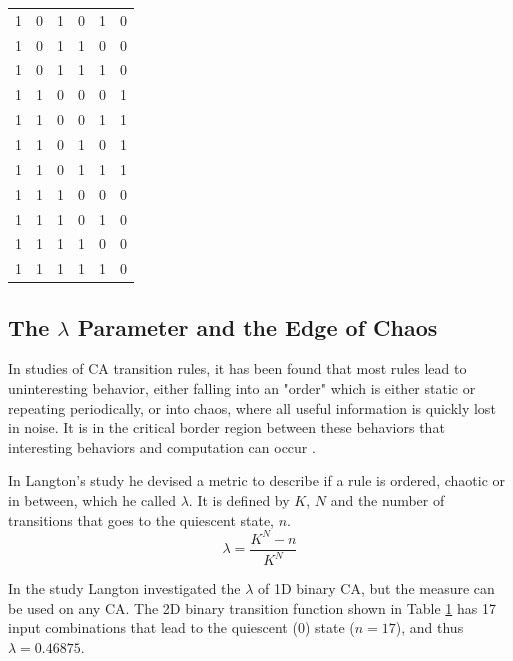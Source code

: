 \begin{table}
\begin{tabular}{lllll|l}
    1      & 0      & 1      & 0      & 1      & 0        \\
    1      & 0      & 1      & 1      & 0      & 0        \\
    1      & 0      & 1      & 1      & 1      & 0        \\
    1      & 1      & 0      & 0      & 0      & 1        \\
    1      & 1      & 0      & 0      & 1      & 1        \\
    1      & 1      & 0      & 1      & 0      & 1        \\
    1      & 1      & 0      & 1      & 1      & 1        \\
    1      & 1      & 1      & 0      & 0      & 0        \\
    1      & 1      & 1      & 0      & 1      & 0        \\
    1      & 1      & 1      & 1      & 0      & 0        \\
    1      & 1      & 1      & 1      & 1      & 0        \\
    \end{tabular}
    \label{tbl:example_CA}
\end{table}

\subsection{The $\lambda$ Parameter and the Edge of Chaos}

In studies of CA transition rules, it has been found that most rules lead to uninteresting behavior,
either falling into an "order" which is either static or repeating periodically,
or into chaos, where all useful information is quickly lost in noise.
It is in the critical border region between these behaviors that interesting behaviors and computation can occur \cite{langton-1990}.

In Langton's study \cite{langton-1990} he devised a metric to describe if a rule is ordered, chaotic or in between, which he called $\lambda$.
It is defined by $K$, $N$ and the number of transitions that goes to the quiescent state, $n$.
\begin{equation}\label{eq:lambda}
    \lambda = \frac{K^N - n}{K^N}
\end{equation}

In the study Langton investigated the $\lambda$ of 1D binary CA, but the measure can be used on any CA.
The 2D binary transition function shown in Table \ref{tbl:example_CA} has 17 input combinations that lead to the quiescent ($0$) state ($n = 17$), and thus $\lambda = 0.46875$.



